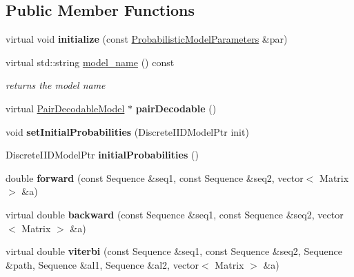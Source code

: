 \subsection*{Public Member Functions}
\begin{DoxyCompactItemize}
\item 
\mbox{\label{classtops_1_1GeneralizedPairHiddenMarkovModel_a7419fbad2199f504b84f492be603281a}} 
virtual void {\bfseries initialize} (const \hyperlink{classtops_1_1ProbabilisticModelParameters}{Probabilistic\+Model\+Parameters} \&par)
\item 
\mbox{\label{classtops_1_1GeneralizedPairHiddenMarkovModel_a1f5984bf7b929bf2619c93a01e7d582e}} 
virtual std\+::string \hyperlink{classtops_1_1GeneralizedPairHiddenMarkovModel_a1f5984bf7b929bf2619c93a01e7d582e}{model\+\_\+name} () const
\begin{DoxyCompactList}\small\item\em returns the model name \end{DoxyCompactList}\item 
\mbox{\label{classtops_1_1GeneralizedPairHiddenMarkovModel_ae059692ad74c1052d4e7b3eaa3a4f17d}} 
virtual \hyperlink{classtops_1_1PairDecodableModel}{Pair\+Decodable\+Model} $\ast$ {\bfseries pair\+Decodable} ()
\item 
\mbox{\label{classtops_1_1GeneralizedPairHiddenMarkovModel_a04f95a6d9a7a7117623a4e2d0843b663}} 
void {\bfseries set\+Initial\+Probabilities} (Discrete\+I\+I\+D\+Model\+Ptr init)
\item 
\mbox{\label{classtops_1_1GeneralizedPairHiddenMarkovModel_a11a0385fdc0a6193f171da0c14143556}} 
Discrete\+I\+I\+D\+Model\+Ptr {\bfseries initial\+Probabilities} ()
\item 
\mbox{\label{classtops_1_1GeneralizedPairHiddenMarkovModel_a012f49565891748243f04d3ee60bfad4}} 
double {\bfseries forward} (const Sequence \&seq1, const Sequence \&seq2, vector$<$ Matrix $>$ \&a)
\item 
\mbox{\label{classtops_1_1GeneralizedPairHiddenMarkovModel_a5f0fe994bb25852ea65d2f0b547918d1}} 
virtual double {\bfseries backward} (const Sequence \&seq1, const Sequence \&seq2, vector$<$ Matrix $>$ \&a)
\item 
\mbox{\label{classtops_1_1GeneralizedPairHiddenMarkovModel_aa472191f618dded4021c29997e9aaa43}} 
virtual double {\bfseries viterbi} (const Sequence \&seq1, const Sequence \&seq2, Sequence \&path, Sequence \&al1, Sequence \&al2, vector$<$ Matrix $>$ \&a)
\end{DoxyCompactItemize}
